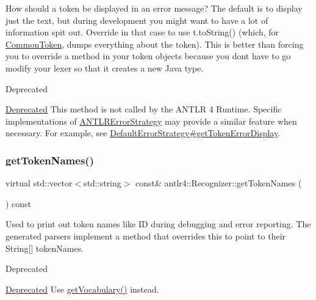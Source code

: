 How should a token be displayed in an error message? The default is to display just the text, but during development you might want to have a lot of information spit out. Override in that case to use t.\+to\+String() (which, for \hyperlink{classantlr4_1_1CommonToken}{Common\+Token}, dumps everything about the token). This is better than forcing you to override a method in your token objects because you don\textquotesingle{}t have to go modify your lexer so that it creates a new Java type.

\begin{DoxyRefDesc}{Deprecated}
\item[\hyperlink{deprecated__deprecated000011}{Deprecated}]This method is not called by the A\+N\+T\+LR 4 Runtime. Specific implementations of \hyperlink{classantlr4_1_1ANTLRErrorStrategy}{A\+N\+T\+L\+R\+Error\+Strategy} may provide a similar feature when necessary. For example, see \hyperlink{}{Default\+Error\+Strategy\#get\+Token\+Error\+Display}. \end{DoxyRefDesc}
\mbox{\label{classantlr4_1_1Recognizer_aef9436cfc73e828229b90a57c8ff2493}} 
\subsubsection{\texorpdfstring{get\+Token\+Names()}{getTokenNames()}}
{\footnotesize\ttfamily virtual std\+::vector$<$std\+::string$>$ const\& antlr4\+::\+Recognizer\+::get\+Token\+Names (\begin{DoxyParamCaption}{ }\end{DoxyParamCaption}) const\hspace{0.3cm}{\ttfamily [pure virtual]}}

Used to print out token names like ID during debugging and error reporting. The generated parsers implement a method that overrides this to point to their String\mbox{[}\mbox{]} token\+Names.

\begin{DoxyRefDesc}{Deprecated}
\item[\hyperlink{deprecated__deprecated000010}{Deprecated}]Use \hyperlink{classantlr4_1_1Recognizer_aae7ec953d3f35749e62ccb96fa3e0946}{get\+Vocabulary()} instead. \end{DoxyRefDesc}


